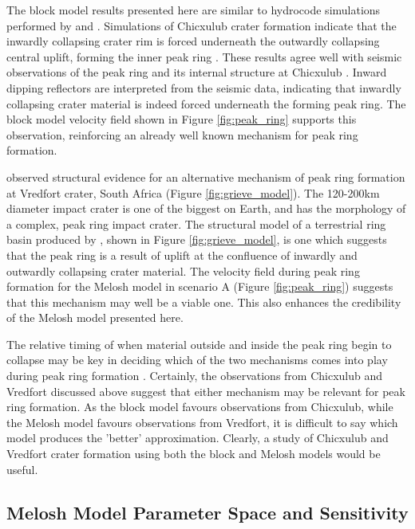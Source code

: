 The block model results presented here are similar to hydrocode simulations performed by \citet{collins2002hydrocode} and \citet{ivanov2005numerical}. Simulations of Chicxulub crater formation indicate that the inwardly collapsing crater rim is forced underneath the outwardly collapsing central uplift, forming the inner peak ring \citep{collins2002hydrocode}. These results agree well with seismic observations of the peak ring and its internal structure at Chicxulub \citep{morgan2011full}. Inward dipping reflectors are interpreted from the seismic data, indicating that inwardly collapsing crater material is indeed forced underneath the forming peak ring. The block model velocity field shown in Figure \ref{fig:peak_ring} supports this observation, reinforcing an already well known mechanism for peak ring formation.

\citet{grieve2008observations} observed structural evidence for an alternative mechanism of peak ring formation at Vredfort crater, South Africa (Figure \ref{fig:grieve_model}). The 120-200km diameter impact crater \citep{turtle2005impact} is one of the biggest on Earth, and has the morphology of a complex, peak ring impact crater. The structural model of a terrestrial ring basin produced by \citet{grieve2008observations}, shown in Figure \ref{fig:grieve_model}, is one which suggests that the peak ring is a result of uplift at the confluence of inwardly and outwardly collapsing crater material. The velocity field during peak ring formation for the Melosh model in scenario A (Figure \ref{fig:peak_ring}) suggests that this mechanism may well be a viable one. This also enhances the credibility of the Melosh model presented here.

The relative timing of when material outside and inside the peak ring begin to collapse may be key in deciding which of the two mechanisms comes into play during peak ring formation \citep{grieve2008observations}. Certainly, the observations from Chicxulub and Vredfort discussed above suggest that either mechanism may be relevant for peak ring formation. As the block model favours observations from Chicxulub, while the Melosh model favours observations from Vredfort, it is difficult to say which model produces the 'better' approximation. Clearly, a study of Chicxulub and Vredfort crater formation using both the block and Melosh models would be useful. 


\subsection{Melosh Model Parameter Space and Sensitivity}

